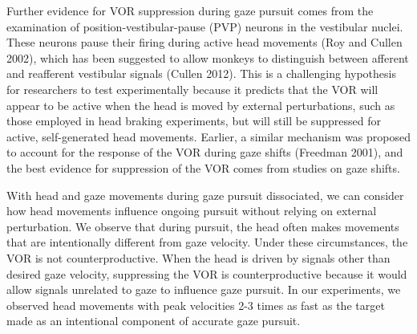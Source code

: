\documentclass[12pt]{article}
\begin{document}
Further evidence for VOR suppression during gaze pursuit comes from the examination of position-vestibular-pause (PVP) neurons in the vestibular nuclei. These neurons pause their firing during active head movements (Roy and Cullen 2002), which has been suggested to allow monkeys to distinguish between afferent and reafferent vestibular signals (Cullen 2012). This is a challenging hypothesis for researchers to test experimentally because it predicts that the VOR will appear to be active when the head is moved by external perturbations, such as those employed in head braking experiments, but will still be suppressed for active, self-generated head movements. Earlier, a similar mechanism was proposed to account for the response of the VOR during gaze shifts (Freedman 2001), and the best evidence for suppression of the VOR comes from studies on gaze shifts.

With head and gaze movements during gaze pursuit dissociated, we can consider how head movements influence ongoing pursuit without relying on external perturbation. We observe that during pursuit, the head often makes movements that are intentionally different from gaze velocity. Under these circumstances, the VOR is not counterproductive. When the head is driven by signals other than desired gaze velocity, suppressing the VOR is counterproductive because it would allow signals unrelated to gaze to influence gaze pursuit. In our experiments, we observed head movements with peak velocities 2-3 times as fast as the target made as an intentional component of accurate gaze pursuit. 
\end{document}
